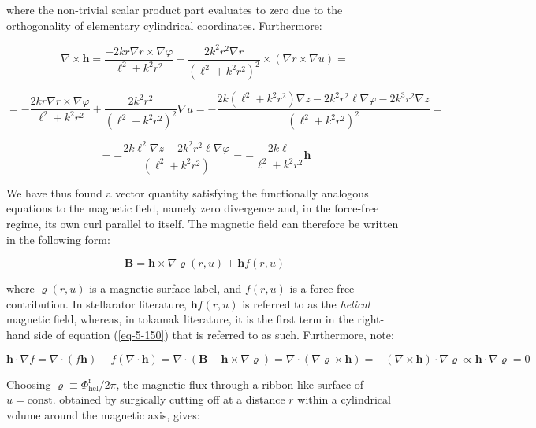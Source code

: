 where the non-trivial scalar product part evaluates to zero due to the orthogonality of elementary cylindrical coordinates. Furthermore:

\begin{equation*}
    \nabla\times\mathbf{h}=\frac{-2kr\nabla r\times\nabla\varphi}{\ell^2+k^2r^2}-\frac{2k^2r^2\nabla r}{(\ell^2+k^2r^2)^2}\times\left(\nabla r\times\nabla u\right)=
\end{equation*}

\begin{equation*}
    =-\frac{2kr\nabla r\times\nabla\varphi}{\ell^2+k^2r^2}+\frac{2k^2r^2}{(\ell^2+k^2r^2)^2}\nabla u=-\frac{2k(\ell^2+k^2r^2)\nabla z-2k^2r^2\ell\nabla\varphi-2k^3r^2\nabla z}{(\ell^2+k^2r^2)^2}=
\end{equation*}

\begin{equation}
    \label{eq-5-149}
    =-\frac{2k\ell^2\nabla z-2k^2r^2\ell\nabla\varphi}{(\ell^2+k^2r^2)}=-\frac{2k\ell}{\ell^2+k^2r^2}\mathbf{h}
\end{equation}

We have thus found a vector quantity satisfying the functionally analogous equations to the magnetic field, namely zero divergence and, in the force-free regime, its own curl parallel to itself. The magnetic field can therefore be written in the following form:

\begin{equation}
    \label{eq-5-150}
    \mathbf{B}=\mathbf{h}\times\nabla\varrho(r,u)+\mathbf{h}f(r,u)
\end{equation}

where $\varrho(r,u)$ is a magnetic surface label, and $f(r,u)$ is a force-free contribution. In stellarator literature, $\mathbf{h}f(r,u)$ is referred to as the \textit{helical} magnetic field, whereas, in tokamak literature, it is the first term in the right-hand side of equation (\ref{eq-5-150}) that is referred to as such. Furthermore, note:

\begin{equation}
    \mathbf{h}\cdot\nabla f=\nabla\cdot(f\mathbf{h})-f(\nabla\cdot\mathbf{h})=\nabla\cdot(\mathbf{B}-\mathbf{h}\times\nabla\varrho)=\nabla\cdot(\nabla\varrho\times\mathbf{h})=-(\nabla\times\mathbf{h})\cdot\nabla\varrho\propto\mathbf{h}\cdot\nabla\varrho=0
\end{equation}

Choosing $\varrho\equiv\Phi_\text{hel}^\text{r}/2\pi$, the magnetic flux through a ribbon-like surface of $u=\text{const.}$ obtained by surgically cutting off at a distance $r$ within a cylindrical volume around the magnetic axis, gives:

